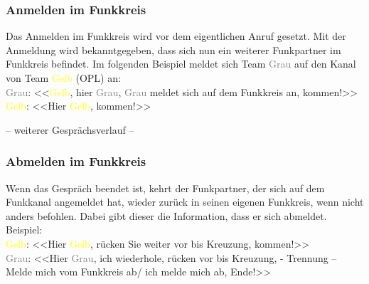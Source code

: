 \subsubsection{Anmelden im Funkkreis}
	Das Anmelden im Funkkreis wird vor dem eigentlichen Anruf gesetzt. Mit der Anmeldung wird bekanntgegeben, dass sich nun ein weiterer Funkpartner im Funkkreis befindet.
	Im folgenden Beispiel meldet sich Team \textcolor{gray}{Grau} auf den Kanal von Team \textcolor{yellow}{Gelb} (OPL) an: \\
	\textcolor{gray}{Grau}: <<\textcolor{yellow}{Gelb}, hier \textcolor{gray}{Grau}, \textcolor{gray}{Grau} meldet sich auf dem Funkkreis an, kommen!>> \\
	\textcolor{yellow}{Gelb}: <<Hier \textcolor{yellow}{Gelb}, kommen!>> \\ 
		\begin{center}
		– weiterer Gesprächsverlauf –
	\end{center}

\subsubsection{Abmelden im Funkkreis}
	Wenn das Gespräch beendet ist, kehrt der Funkpartner, der sich auf dem Funkkanal angemeldet hat, wieder zurück in seinen eigenen Funkkreis, wenn nicht anders befohlen. Dabei gibt dieser die Information, dass er sich abmeldet. \\
	Beispiel: \\
	\textcolor{yellow}{Gelb}: <<Hier \textcolor{yellow}{Gelb}, rücken Sie weiter vor bis Kreuzung, kommen!>> \\
	\textcolor{gray}{Grau}: <<Hier \textcolor{gray}{Grau}, ich wiederhole, rücken vor bis Kreuzung, - Trennung – Melde mich vom Funkkreis ab/ ich melde mich ab, Ende!>> \\

